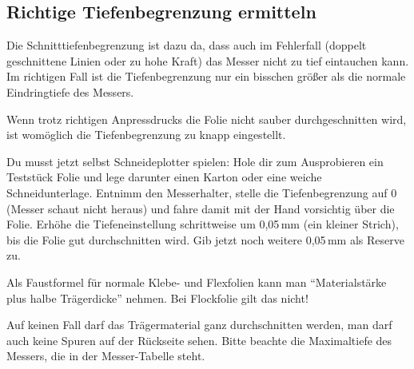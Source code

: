 \documentclass{\basedir/fablab-document}
\begin{document}
\subsection{Richtige Tiefenbegrenzung ermitteln}

Die Schnitttiefenbegrenzung ist dazu da, dass auch im Fehlerfall (doppelt geschnittene Linien oder zu hohe Kraft) das Messer nicht zu tief eintauchen kann.
Im richtigen Fall ist die Tiefenbegrenzung nur ein bisschen größer als die normale Eindringtiefe des Messers.


Wenn trotz richtigen Anpressdrucks die Folie nicht sauber durchgeschnitten wird, ist womöglich die Tiefenbegrenzung zu knapp eingestellt. 

Du musst jetzt selbst Schneideplotter spielen:
Hole dir zum Ausprobieren ein Teststück Folie und lege darunter einen Karton oder eine weiche Schneidunterlage.
Entnimm den Messerhalter, stelle die Tiefenbegrenzung auf 0 (Messer schaut nicht heraus) und fahre damit mit der Hand vorsichtig über die Folie.
Erhöhe die Tiefeneinstellung schrittweise um 0,05\,mm (ein kleiner Strich), bis die Folie gut durchschnitten wird.
Gib jetzt noch weitere 0,05\,mm als Reserve zu.

Als Faustformel für normale Klebe- und Flexfolien kann man \enquote{Materialstärke plus halbe Trägerdicke} nehmen.
Bei Flockfolie gilt das nicht!

Auf keinen Fall darf das Trägermaterial ganz durchschnitten werden, man darf auch keine Spuren auf der Rückseite sehen.
Bitte beachte die Maximaltiefe des Messers, die in der Messer-Tabelle steht.
\end{document}
